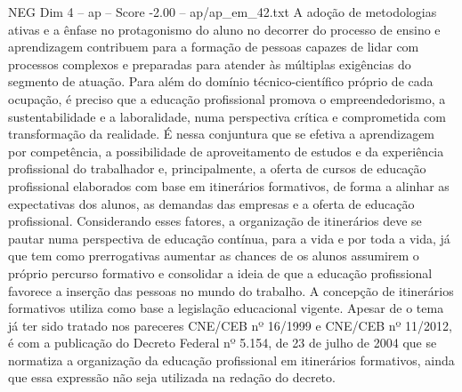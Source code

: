 \begin{textsample}{NEG Dim 4 – ap – Score -2.00 – ap/ap\_em\_42.txt}
A adoção de metodologias ativas e a ênfase no protagonismo do aluno no decorrer do processo de ensino e aprendizagem contribuem para a formação de pessoas capazes de lidar com processos complexos e preparadas para atender às múltiplas exigências do segmento de atuação.
Para além do domínio técnico-científico próprio de cada ocupação, é preciso que a educação profissional promova o empreendedorismo, a sustentabilidade e a laboralidade, numa perspectiva crítica e comprometida com transformação da realidade.
É nessa conjuntura que se efetiva a aprendizagem por competência, a possibilidade de aproveitamento de estudos e da experiência profissional do trabalhador e, principalmente, a oferta de cursos de educação profissional elaborados com base em itinerários formativos, de forma a alinhar as expectativas dos alunos, as demandas das empresas e a oferta de educação profissional.
Considerando esses fatores, a organização de itinerários deve se pautar numa perspectiva de educação contínua, para a vida e por toda a vida, já que tem como prerrogativas aumentar as chances de os alunos assumirem o próprio percurso formativo e consolidar a ideia de que a educação profissional favorece a inserção das pessoas no mundo do trabalho.
A concepção de itinerários formativos utiliza como base a legislação educacional vigente.
Apesar de o tema já ter sido tratado nos pareceres CNE/CEB nº 16/1999 e CNE/CEB nº 11/2012, é com a publicação do Decreto Federal nº 5.154, de 23 de julho de 2004 que se normatiza a organização da educação profissional em itinerários formativos, ainda que essa expressão não seja utilizada na redação do decreto.

\end{textsample}
